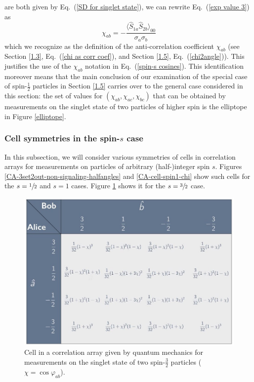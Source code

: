 are both given by Eq.\ (\ref{SD for singlet state}), we can rewrite Eq.\ (\ref{exp value 3}) as
\begin{equation}
\chi_{ab} = - \frac{\langle \hat{S}_{1a}\hat{S}_{2b}\rangle_{00}}{\sigma_a \sigma_b}
\end{equation}
which we recognize as the definition of the anti-correlation coefficient $\chi_{ab}$ (see Section \ref{1.3}, Eq.\ (\ref{chi as corr coef}), and Section \ref{1.5}, Eq.\ (\ref{chi2angle})). This justifies the use of the $\chi_{ab}$ notation in Eq.\ (\ref{spin-s cosines}). This identification moreover means that the main conclusion of our examination of the special case of spin-$\frac12$ particles in Section \ref{1.5} carries over to the general case considered in this section: the set of values for $(\chi_{ab},\chi_{ac},\chi_{bc})$ that can be obtained by measurements on the singlet state of two particles of higher spin is the elliptope in Figure \ref{elliptope}.

\subsubsection{Cell symmetries in the spin-$s$ case} \label{2.1.6}

In this subsection, we will consider various symmetries of cells in correlation arrays for measurements on particles of arbitrary (half-)integer spin $s$.  Figures \ref{CA-3set2out-non-signaling-halfangles} and \ref{CA-cell-spin1-chi} show such cells for the $s = \sfrac12$ and $s = 1$ cases. Figure \ref{CA-2set4out} shows it for the $s = \sfrac32$ case.

\begin{figure}[ht]
 \centering
   \includegraphics[width=4.5in]{CA-2set4out.jpeg} 
   \caption{Cell in a correlation array given by quantum mechanics for measurements on the singlet state of two spin-$\frac32$ particles ($\chi = \cos{\varphi_{ab}}$).}
   \label{CA-2set4out}
\end{figure} 


